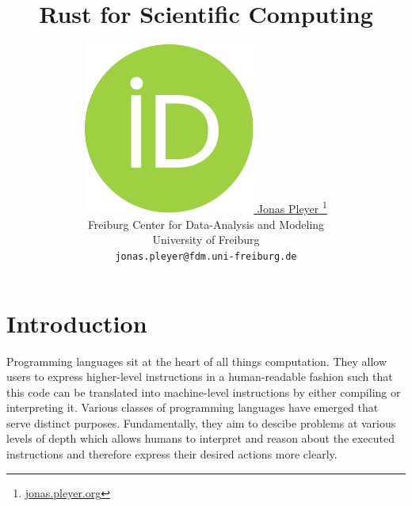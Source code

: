 \documentclass{article}
\title{Rust for Scientific Computing}
\author{
    \href{https://orcid.org/0009-0001-0613-7978}{
        \includegraphics[scale=0.06]{orcid.pdf}
        \hspace{1mm}Jonas Pleyer
    }
    \thanks{
        \href{https://jonas.pleyer.org}{jonas.pleyer.org}
    }\\
    Freiburg Center for Data-Analysis and Modeling\\
    University of Freiburg\\
    \texttt{jonas.pleyer@fdm.uni-freiburg.de}
}
\begin{document}
\maketitle

\begin{abstract}
\end{abstract}

\pagebreak
\tableofcontents

\twocolumn
\pagebreak

\prntlen{\columnwidth}


\section{Introduction}


Programming languages sit at the heart of all things computation.
They allow users to express higher-level instructions in a human-readable fashion such that this
code can be translated into machine-level instructions by either compiling or interpreting it.
Various classes of programming languages have emerged that serve distinct purposes.
Fundamentally, they aim to descibe problems at various levels of depth which allows humans to
interpret and reason about the executed instructions and therefore express their desired actions
more clearly.
\end{document}
